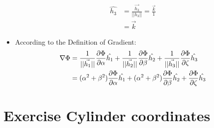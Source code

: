 \documentclass[12pt,a4paper]{article}
\begin{document}
\begin{itemize}
    \begin{equation}
    \begin{aligned}
       \hat{h_3} &= \frac{\vec{h_3}}{||h_3||}
       = \frac{\vec{k}}{1}\\
       &= \vec{k}
       \end{aligned}
    \end{equation}
    \item According to the Definition of Gradient:\\
    \begin{equation}
    \begin{aligned}
    \nabla\Phi &= \frac{1}{||\vec{h_1}||}\frac{\partial \Phi}{\partial\alpha}\hat{h_1}+\frac{1}{||\vec{h_2}||}\frac{\partial \Phi}{\partial\beta}\hat{h_2}+\frac{1}{||\vec{h_3}||}\frac{\partial \Phi}{\partial\zeta}\hat{h_3}\\
    &= (\alpha^2 + \beta^2)\frac{\partial \Phi}{\partial\alpha}\hat{h_1} + (\alpha^2 + \beta^2)\frac{\partial \Phi}{\partial\beta}\hat{h_2}+\frac{\partial \Phi}{\partial\zeta}\hat{h_3}\notag
      \end{aligned}
    \end{equation}
    \end{itemize}
\section{Exercise Cylinder coordinates}\label{intro}
\end{document}
